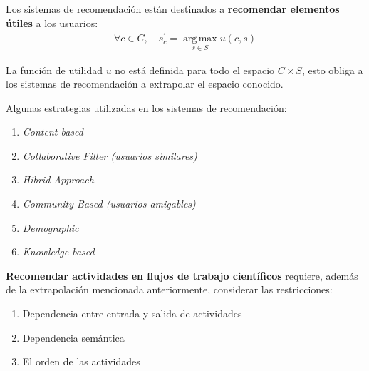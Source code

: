 \begin{frame}		
	\begin{block}{}
		Los sistemas de recomendación están destinados a \textbf{recomendar elementos útiles} a los usuarios:
		\begin{eqnarray}
		\forall c \in C,  \quad s_{c}^{'} =  \operatorname*{arg\,max}_{s \in S} u(c,s) \label{formalizar_recomendacao}
		\end{eqnarray}
		
		La función de utilidad \(u\) no está definida para todo el espacio \(C \times S\), esto obliga a los sistemas de recomendación a extrapolar el espacio conocido.
	\end{block}
\end{frame}


\begin{frame}
	\begin{block}{}
		Algunas estrategias utilizadas en los sistemas de recomendación:
		
		\begin{enumerate}
			\item \emph{Content-based}
			\item \emph{Collaborative Filter (usuarios similares)}
			\item \emph{Hibrid Approach}
			\item \emph{Community Based (usuarios amigables)}
			\item \emph{Demographic}
			\item \emph{Knowledge-based}
		\end{enumerate}
	\end{block}
\end{frame}


\begin{frame}		
	\begin{block}{}
		\textbf{Recomendar actividades en flujos de trabajo científicos} requiere, además de la extrapolación mencionada anteriormente, considerar las restricciones:
		\begin{enumerate}
			\item Dependencia entre entrada y salida de actividades
			\item Dependencia semántica
			\item El orden de las actividades
		\end{enumerate}
	\end{block}
\end{frame}


